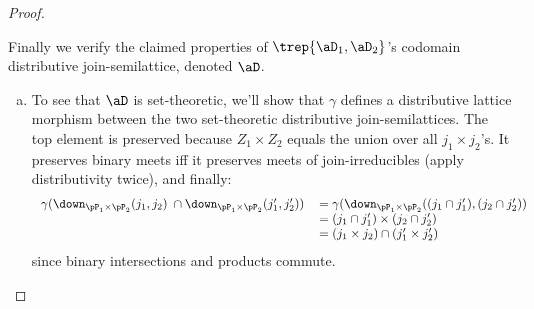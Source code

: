 \documentclass{article}
\begin{document}
\begin{proof}
\begin{enumerate}
\smallskip
Finally we verify the claimed properties of $\trep{\aD_1,\aD_2}$'s codomain distributive join-semilattice, denoted $\aD$.

\begin{enumerate}[(a)]
\item
To see that $\aD$ is set-theoretic, we'll show that $\gamma$ defines a distributive lattice morphism between the two set-theoretic distributive join-semilattices. The top element is preserved because $Z_1 \times Z_2$ equals the union over all $j_1 \times j_2$'s. It preserves binary meets iff it preserves meets of join-irreducibles (apply distributivity twice), and finally:
\[
\begin{tabular}{lll}
$\gamma(\down_{\pP_1 \times \pP_2} (j_1,j_2) \;\cap \down_{\pP_1 \times \pP_2} (j'_1,j'_2))$
&
$= \gamma(\down_{\pP_1 \times \pP_2} ((j_1 \cap j'_1),(j_2 \cap j'_2))$
\\&
$= (j_1 \cap j'_1) \times (j_2 \cap j'_2)$
\\&
$= (j_1 \times j_2) \cap (j'_1 \times j'_2)$
\end{tabular}
\]
since binary intersections and products commute.


\end{enumerate}
\end{enumerate}
\end{proof}
\end{document}
